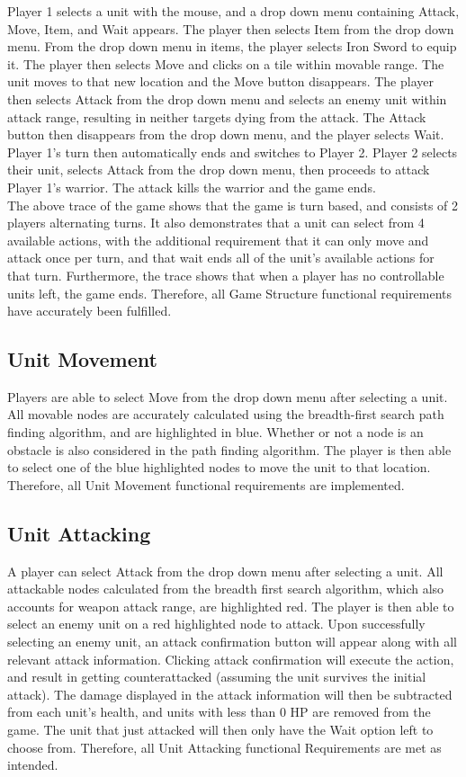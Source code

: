 \documentclass{article}
\begin{document}
\noindent Player 1 selects a unit with the mouse, and a drop down menu containing Attack, Move, Item, and Wait appears. The player then selects Item from the drop down menu. From the drop down menu in items, the player selects Iron Sword to equip it. The player then selects Move and clicks on a tile within movable range. The unit moves to that new location and the Move button disappears. The player then selects Attack from the drop down menu and selects an enemy unit within attack range, resulting in neither targets dying from the attack. The Attack button then disappears from the drop down menu, and the player selects Wait. Player 1's turn then automatically ends and switches to Player 2. Player 2 selects their unit, selects Attack from the drop down menu, then proceeds to attack Player 1's warrior. The attack kills the warrior and the game ends. \\

\noindent The above trace of the game shows that the game is turn based, and consists of 2 players alternating turns. It also demonstrates that a unit can select from 4 available actions, with the additional requirement that it can only move and attack once per turn, and that wait ends all of the unit's available actions for that turn. Furthermore, the trace shows that when a player has no controllable units left, the game ends. Therefore, all Game Structure functional requirements have accurately been fulfilled.

\subsection{Unit Movement}

Players are able to select Move from the drop down menu after selecting a unit. All movable nodes are accurately calculated using the breadth-first search path finding algorithm, and are highlighted in blue. Whether or not a node is an obstacle is also considered in the path finding algorithm. The player is then able to select one of the blue highlighted nodes to move the unit to that location. Therefore, all Unit Movement functional requirements are implemented.

\subsection{Unit Attacking}

A player can select Attack from the drop down menu after selecting a unit. All attackable nodes calculated from the breadth first search algorithm, which also accounts for weapon attack range, are highlighted red. The player is then able to select an enemy unit on a red highlighted node to attack. Upon successfully selecting an enemy unit, an attack confirmation button will appear along with all relevant attack information. Clicking attack confirmation will execute the action, and result in getting counterattacked (assuming the unit survives the initial attack). The damage displayed in the attack information will then be subtracted from each unit's health, and units with less than 0 HP are removed from the game. The unit that just attacked will then only have the Wait option left to choose from. Therefore, all Unit Attacking functional Requirements are met as intended.
\end{document}
